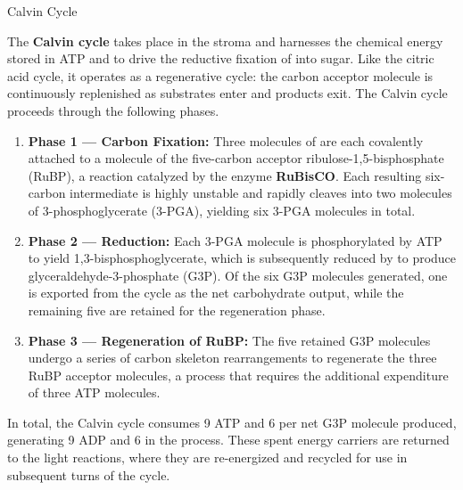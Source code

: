 \documentclass[10pt]{article}
\begin{document}
    \begin{core}[label=core:calvin_cycle]{Calvin Cycle}

      The \textbf{Calvin cycle} takes place in the stroma and harnesses the chemical energy stored in ATP and  to drive the reductive fixation of  into sugar. Like the citric acid cycle, it operates as a regenerative cycle: the carbon acceptor molecule is continuously replenished as substrates enter and products exit. The Calvin cycle proceeds through the following phases.

      \begin{enumerate}

        \item \textbf{Phase 1 --- Carbon Fixation:} Three molecules of  are each covalently attached to a molecule of the five-carbon acceptor ribulose-1,5-bisphosphate (RuBP), a reaction catalyzed by the enzyme \textbf{RuBisCO}. Each resulting six-carbon intermediate is highly unstable and rapidly cleaves into two molecules of 3-phosphoglycerate (3-PGA), yielding six 3-PGA molecules in total.

        \item \textbf{Phase 2 --- Reduction:} Each 3-PGA molecule is phosphorylated by ATP to yield 1,3-bisphosphoglycerate, which is subsequently reduced by  to produce glyceraldehyde-3-phosphate (G3P). Of the six G3P molecules generated, one is exported from the cycle as the net carbohydrate output, while the remaining five are retained for the regeneration phase.

        \item \textbf{Phase 3 --- Regeneration of RuBP:} The five retained G3P molecules undergo a series of carbon skeleton rearrangements to regenerate the three RuBP acceptor molecules, a process that requires the additional expenditure of three ATP molecules.

      \end{enumerate}

      In total, the Calvin cycle consumes 9 ATP and 6  per net G3P molecule produced, generating 9 ADP and 6  in the process. These spent energy carriers are returned to the light reactions, where they are re-energized and recycled for use in subsequent turns of the cycle. 


    \end{core}
\end{document}
